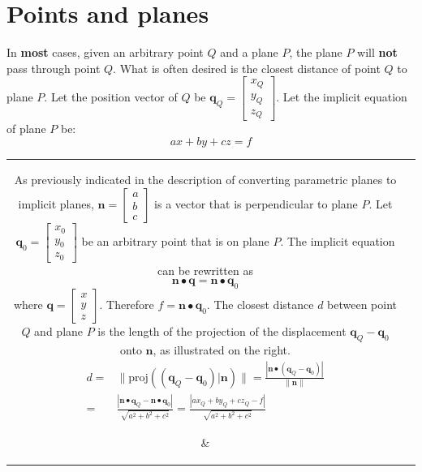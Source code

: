 \documentclass{article}
\begin{document}
\section*{Points and planes}

In {\bf most} cases, given an arbitrary point \(Q\) and a plane \(P\), the plane \(P\) will {\bf not} pass through point \(Q\). What is often desired is the closest distance of point \(Q\) to plane \(P\).  Let the position vector of \(Q\) be \(\mathbf{q}_Q = \begin{bmatrix} x_Q \\ y_Q \\ z_Q \end{bmatrix}\). Let the implicit equation of plane \(P\) be:
\[ax + by + cz = f\]

\begin{tabular}{cc}
\parbox{0.5\textwidth}{
As previously indicated in the description of converting parametric planes to implicit planes, \(\mathbf{n} = \begin{bmatrix} a \\ b \\ c \end{bmatrix}\) is a vector that is perpendicular to plane \(P\). Let \(\mathbf{q}_0 = \begin{bmatrix} x_0 \\ y_0 \\ z_0 \end{bmatrix}\) be an arbitrary point that is on plane \(P\). The implicit equation can be rewritten as 
\[\mathbf{n} \bullet \mathbf{q} = \mathbf{n} \bullet \mathbf{q}_0\]
where \(\mathbf{q} = \begin{bmatrix} x \\ y \\ z \end{bmatrix}\). Therefore \(f = \mathbf{n} \bullet \mathbf{q}_0\). 
The closest distance \(d\) between point \(Q\) and plane \(P\) is the length of the projection of the displacement \(\mathbf{q}_Q - \mathbf{q}_0\) onto \(\mathbf{n}\), as illustrated on the right.  
\begin{align*}
d = & \|\text{proj}((\mathbf{q}_Q - \mathbf{q}_0)|\mathbf{n})\| = \frac{|\mathbf{n} \bullet (\mathbf{q}_Q - \mathbf{q}_0)|}{\|\mathbf{n}\|} \\ 
= & \frac{|\mathbf{n} \bullet \mathbf{q}_Q - \mathbf{n} \bullet \mathbf{q}_0|}{\sqrt{a^2 + b^2 + c^2}}
= \frac{|a x_Q + b y_Q + c z_Q - f|}{\sqrt{a^2 + b^2 + c^2}}
\end{align*}
} & \parbox{0.5\textwidth}{
}
\end{tabular}
\end{document}
